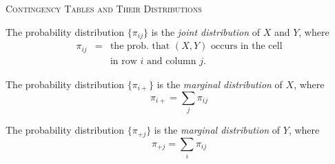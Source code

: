 \documentclass[dvipdfmx, serif,handout]{beamer}
\begin{document}
%
%
\begin{frame}{\textsc{Contingency Tables and Their Distributions}}

\bi
\item The probability distribution $\{\pi_{ij}\}$ is the {\it joint distribution} of $X$ and $Y$, where
\begin{eqnarray*}
\pi_{ij} &=& \mbox{the prob. that $(X,Y)$ occurs in the cell}\\
&& \mbox{in row $i$ and column $j$.}
\end{eqnarray*}
\item The probability distribution $\{\pi_{i+}\}$ is the {\it marginal distribution} of $X$, where
$$\pi_{i+} = \sum_j \pi_{ij}$$
\item The probability distribution $\{\pi_{+j}\}$ is the {\it marginal distribution} of $Y$, where
$$\pi_{+j} = \sum_i \pi_{ij}$$
\ei

\end{frame}
\end{document}
